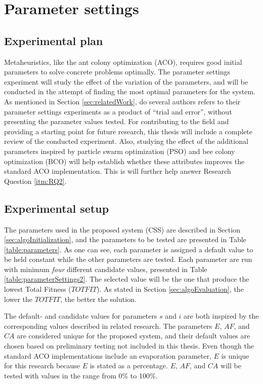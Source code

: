 \section{Parameter settings}
\label{sec:parametersettings}

\subsection{Experimental plan}
Metaheuristics, like the ant colony optimization (ACO), requires good initial parameters to solve concrete problems optimally. The parameter settings experiment will study the effect of the variation of the parameters, and will be conducted in the attempt of finding the most optimal parameters for the system. As mentioned in Section \vref{sec:relatedWork}, do several authors refers to their parameter settings experiments as a product of ``trial and error'', without presenting the parameter values tested. For contributing to the field and providing a starting point for future research, this thesis will include a complete review of the conducted experiment. %
Also, studying the effect of the additional parameters inspired by particle swarm optimization (PSO) and bee colony optimization (BCO) will help establish whether these attributes improves the standard ACO implementation. This is will further help answer Research Question \vref{itm:RQ2}.

\subsection{Experimental setup}
\label{subsec:parameterSettings_setup}
The parameters used in the proposed system (CSS) are described in Section \vref{sec:algoInitialization}, and the parameters to be tested are presented in Table \ref{table:parameters}. As one can see, each parameter is assigned a default value to be held constant while the other parameters are tested. Each parameter are run with minimum \textit{four} different candidate values, presented in Table \vref{table:parameterSettings2}. The selected value will be the one that produce the lowest Total Fitness ($TOTFIT$). As stated in Section \vref{sec:algoEvaluation}, the lower the $TOTFIT$, the better the solution. 

The default- and candidate values for parameters $s$ and $i$ are both inspired by the corresponding values described in related research\citep{salehi-nezhad07, poorzahedy11, sedighpour14, kechagiopoulos14}. The parameters $E$, $AF$, and $CA$ are considered unique for the proposed system, and their default values are chosen based on preliminary testing not included in this thesis. Even though the standard ACO implementations include an evaporation parameter, $E$ is unique for this research because $E$ is stated as a percentage. $E$, $AF$, and $CA$ will be tested with values in the range from 0\% to 100\%. %

